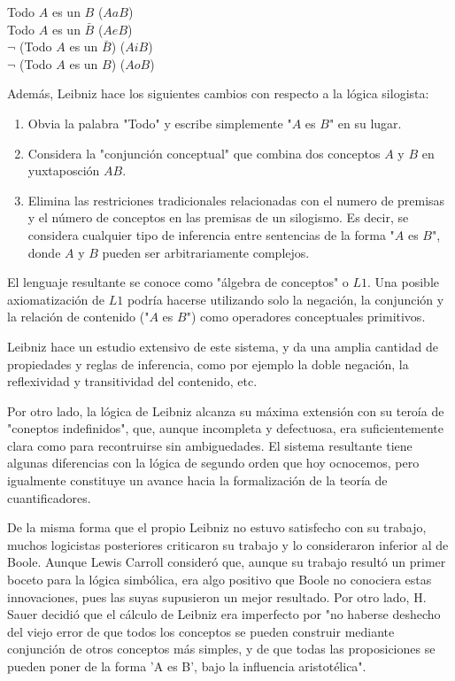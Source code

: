 \documentclass{article}
\begin{document}
\begin{displayquote}
    Todo $A$ es un $B$ ($AaB$)\\
    Todo $A$ es un $\bar{B}$ ($AeB$)\\
    $\lnot$ (Todo $A$ es un $\bar{B}$) ($AiB$)\\
    $\lnot$ (Todo $A$ es un $B$) ($AoB$)\\
\end{displayquote}

Además, Leibniz hace los siguientes cambios con respecto a la lógica silogista:


\begin{enumerate}
    \item Obvia la palabra "Todo" y escribe simplemente "$A$ es $B$" en su lugar.
    \item Considera la "conjunción conceptual" que combina dos conceptos $A$ y $B$ en yuxtaposción $AB$.
    \item Elimina las restriciones tradicionales relacionadas con el numero de premisas y el número de conceptos en las premisas de un silogismo. Es decir, se considera cualquier tipo de inferencia entre sentencias de la forma "$A$ es $B$", donde $A$ y $B$ pueden ser arbitrariamente complejos.
\end{enumerate}

El lenguaje resultante se conoce como "álgebra de conceptos" o $L1$. Una posible axiomatización de $L1$ podría hacerse utilizando solo la negación, la conjunción y la relación de contenido ("$A$ es $B$") como operadores conceptuales primitivos.

Leibniz hace un estudio extensivo de este sistema, y da una amplia cantidad de propiedades y reglas de inferencia, como por ejemplo la doble negación, la reflexividad y transitividad del contenido, etc.

Por otro lado, la lógica de Leibniz alcanza su máxima extensión con su teroía de "coneptos indefinidos", que, aunque incompleta y defectuosa, era suficientemente clara como para recontruirse sin ambiguedades. El sistema resultante tiene algunas diferencias con la lógica de segundo orden que hoy ocnocemos, pero igualmente constituye un avance hacia la formalización de la teoría de cuantificadores.

De la misma forma que el propio Leibniz no estuvo satisfecho con su trabajo, muchos logicistas posteriores criticaron su trabajo y lo consideraron inferior al de Boole. Aunque Lewis Carroll consideró que, aunque su trabajo resultó un primer boceto para la lógica simbólica, era algo positivo que Boole no conociera estas innovaciones, pues las suyas supusieron un mejor resultado. Por otro lado, H. Sauer decidió que el cálculo de Leibniz era imperfecto por "no haberse deshecho del viejo error de que todos los conceptos se pueden construir mediante conjunción de otros conceptos más simples, y de que todas las proposiciones se pueden poner de la forma 'A es B', bajo la influencia aristotélica".
\end{document}
